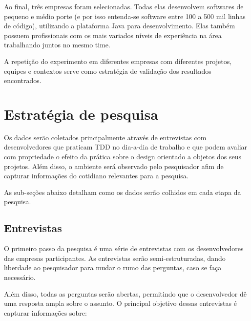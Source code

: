 Ao final, três empresas foram selecionadas. Todas elas desenvolvem softwares de
pequeno e médio porte (e por isso entenda-se software entre 100 a 500 mil linhas
de código), utilizando a plataforma Java para desenvolvimento. Elas também 
possuem profissionais com os mais variados níveis de experiência na área 
trabalhando juntos no mesmo time.

A repetição do experimento em diferentes empresas com diferentes projetos,
equipes e contextos serve como estratégia de validação dos resultados
encontrados.

\section{Estratégia de pesquisa} 
\label{sec:planejamento-estrategia}


Os dados serão coletados principalmente através de entrevistas com
desenvolvedores que praticam TDD no dia-a-dia de trabalho e que podem avaliar
com propriedade o efeito da prática sobre o design orientado a objetos dos seus 
projetos. Além disso, o ambiente será observado pelo pesquisador afim de
capturar informações do cotidiano relevantes para a pesquisa.

As sub-seções abaixo detalham como os dados serão colhidos em cada etapa da pesquisa.

\subsection{Entrevistas}
\label{sec:planejamento-estrategia-entrevistas}

O primeiro passo da pesquisa é uma série de entrevistas com os desenvolvedores 
das empresas participantes. As entrevistas serão semi-estruturadas, dando
liberdade ao pesquisador para mudar o rumo das perguntas, caso se faça
necessário.

Além disso, todas as perguntas serão abertas, permitindo que o desenvolvedor dê
uma resposta ampla sobre o assunto. O principal objetivo dessas entrevistas é
capturar informações sobre:

